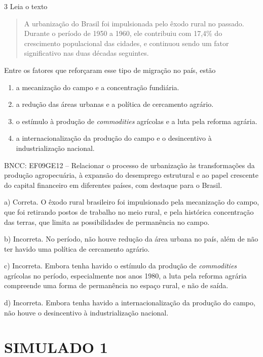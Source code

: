 \num{3} Leia o texto

\begin{quote}
A urbanização do Brasil foi impulsionada pelo êxodo rural no passado.
Durante o período de 1950 a 1960, ele contribuiu com 17,4\% do
crescimento populacional das cidades, e continuou sendo um fator
significativo nas duas décadas seguintes.
\end{quote}


Entre os fatores que reforçaram esse tipo de migração no país, estão

\begin{enumerate}
\def\labelenumi{\alph{enumi})}
\item
  a mecanização do campo e a concentração fundiária.
\item
  a redução das áreas urbanas e a política de cercamento agrário.
\item
  o estímulo à produção de \emph{commodities} agrícolas e a luta pela
  reforma agrária.
\item
  a internacionalização da produção do campo e o desincentivo à
  industrialização nacional.
\end{enumerate}

BNCC: EF09GE12 -- Relacionar o processo de urbanização às transformações
da produção agropecuária, à expansão do desemprego estrutural e ao papel
crescente do capital financeiro em diferentes países, com destaque para
o Brasil.

a) Correta. O êxodo rural brasileiro foi impulsionado pela mecanização
do campo, que foi retirando postos de trabalho no meio rural, e pela
histórica concentração das terras, que limita as possibilidades de
permanência no campo.

b) Incorreta. No período, não houve redução da área urbana no país, além
de não ter havido uma política de cercamento agrário.

c) Incorreta. Embora tenha havido o estímulo da produção de
\emph{commodities} agrícolas no período, especialmente nos anos 1980, a
luta pela reforma agrária compreende uma forma de permanência no espaço
rural, e não de saída.

d) Incorreta. Embora tenha havido a internacionalização da produção do
campo, não houve o desincentivo à industrialização nacional.



\chapter{SIMULADO 1}

